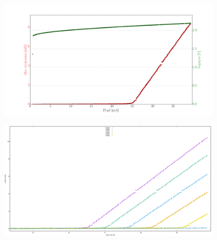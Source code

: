 \documentclass[xcolor={dvipsnames,table}]{beamer}
\begin{document}
\begin{frame}
\center
\begin{figure}
   \includegraphics[width=1.10\textwidth,natwidth=69,natheight=87]{635/plot_ivl_25.png}
\end{figure}

\end{frame}

\begin{frame}
\center
\begin{figure}
   \includegraphics[width=1.0\textwidth,natwidth=69,natheight=87]{635/plot_all.png}
\end{figure}
\end{frame}
\end{document}
